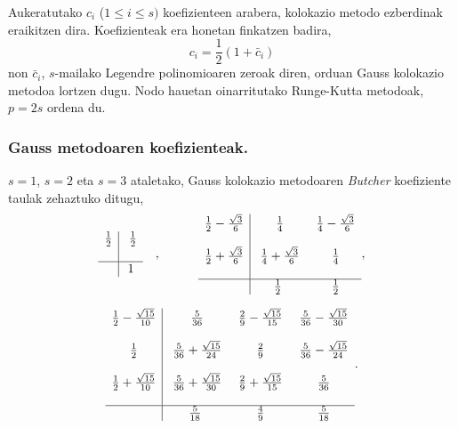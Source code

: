 Aukeratutako $c_i$ ($1 \leq i \leq s)$ koefizienteen arabera, kolokazio metodo ezberdinak eraikitzen dira. Koefizienteak era honetan finkatzen badira,
\begin{equation*}
c_i=\frac{1}{2}(1+\bar{c}_i)
\end{equation*}
non $\bar{c}_i$, $s$-mailako Legendre polinomioaren zeroak diren, orduan Gauss kolokazio metodoa lortzen dugu.
Nodo hauetan oinarritutako Runge-Kutta metodoak, $p=2s$ ordena du.

\subsubsection*{Gauss metodoaren koefizienteak.}

$s=1$, $s=2$ eta $s=3$ ataletako, Gauss kolokazio metodoaren \cite{Hairer2006} \emph{Butcher} koefiziente taulak \cite{Hairer2006} zehaztuko ditugu,
\begin{equation*}
\begin{array}{c|c}
  \frac{1}{2} & \ \frac{1}{2} \\
  \\
  \hline
   & 1 \\
\end{array} \ \ \ ,  \ \ \ \ \ \ \ \ \
\begin{array}{c|c c}
  \frac{1}{2}-\frac{\sqrt{3}}{6} & \ \frac{1}{4} & \ \frac{1}{4}-\frac{\sqrt{3}}{6} \\
  \\
  \frac{1}{2}+\frac{\sqrt{3}}{6} & \ \frac{1}{4}+\frac{\sqrt{3}}{6} & \ \frac{1}{4} \\
  \\
  \hline
         &  \frac{1}{2} & \ \frac{1}{2} \\
\end{array},
\end{equation*}

\begin{equation*}
\begin{array}{c|c c c}
  \frac{1}{2}-\frac{\sqrt{15}}{10} & \ \frac{5}{36} & \ \frac{2}{9}-\frac{\sqrt{15}}{15} & \ \frac{5}{36}-\frac{\sqrt{15}}{30} \\
  \\
  \frac{1}{2}   & \ \frac{5}{36}+\frac{\sqrt{15}}{24} & \ \frac{2}{9} & \ \frac{5}{36}-\frac{\sqrt{15}}{24} \\
  \\
  \frac{1}{2}+\frac{\sqrt{15}}{10}   & \ \frac{5}{36}+\frac{\sqrt{15}}{30} & \ \frac{2}{9}+\frac{\sqrt{15}}{15} & \ \frac{5}{36} \\
  \\
  \hline
  & \frac{5}{18} & \ \frac{4}{9} & \ \frac{5}{18}
\end{array}.
\end{equation*}


